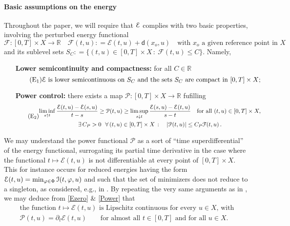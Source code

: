 \documentclass[a4paper,10pt,reqno]{amsart} %
\newcommand{\R}{\mathbb{R}}
\numberwithin{equation}{section}
\newcommand{\up}{\uparrow}
\newcommand{\down}{\downarrow}
\newcommand{\Xs}{X}
\newcommand{\md}[2]{\mathsf{d}(#1,#2)}
\newcommand{\ene}[2]{\mathcal{E}(#1,#2)}
\newcommand{\pertn}{\mathcal{F}}
\newcommand{\pert}[2]{\mathcal{F}(#1,#2)}
\newcommand{\pwn}{\mathcal{P}}
\newcommand{\pw}[2]{\mathcal{P}(#1,#2)}
\newcommand{\subl}[1]{S_{#1}}
\begin{document}
 \paragraph{\bf Basic assumptions on the energy}
Throughout the paper, we will require that  ${\mathcal E}$ complies with two basic properties, involving the perturbed energy functional
\begin{equation}
\pertn: [0,T]\times \Xs \to \R \quad \pert tu: = \ene tu + \md{x_o}u \quad \text{with $x_o$ a given reference point in $X$}
\end{equation}
and its sublevel sets $\subl C: = \{ (t,u)\in [0,T]\times \Xs\, : \ \pert tu \leq C\}$. Namely,
\begin{itemize}
\item[\textbf{Lower semicontinuity and compactness:}] for all $C\in \R$
\begin{equation}
\label{Ezero}
\tag{$\mathrm{E}_1$}
\text{$\calE$ is lower semicontinuous on $\subl C  $ and the sets $\subl C$ are compact in $[0,T]\times X$};
\end{equation}
\item[\textbf{Power control:}]  there exists a map $\pwn : [0,T]\times \Xs \to \R$ fufilling 
\begin{equation}
\label{Power}
\tag{$\mathrm{E}_2$}
\begin{gathered}
\liminf_{s\up t} \frac{\ene tu -\ene su}{t-s} \geq \pw tu \geq \limsup_{s\down t} \frac{\ene su -\ene tu}{s-t} \quad \text{for all } (t,u) \in [0,T]\times \Xs,
\\
\exists\, C_P>0 \ \  \forall\, (t,u) \in [0,T]\times \Xs\, : \quad
|\pw tu | \leq C_P \pert tu\,.
\end{gathered}
\end{equation}
\end{itemize}
We may understand the power functional $\pwn$ as a sort of ``time superdifferential'' of the energy functional, surrogating its partial time derivative 
in the case where the functional  $t\mapsto \ene tu $ is not differentiable  at every point of $[0,T]\times \Xs$. This for instance occurs for reduced energies having the form $\ene tu = \min_{\varphi \in \Phi} \calI(t,\varphi, u)$ and such that the set of minimizers 
does not reduce to a singleton,
as considered, e.g., in \cite{KMZ10-poly,MRS2013,MRS-MJM,SavMin16}.
 By repeating the very same arguments as in \cite{SavMin16}, we may deduce from \eqref{Ezero} \& \eqref{Power} that
\begin{equation}
\label{Lip-cont-E}
\begin{gathered}
\text{
the function $t\mapsto \ene tu $ is Lipschitz continuous  for every $u\in \Xs$, with}
\\
\pw tu = \partial_t \ene tu \qquad \text{for almost all } t \in [0,T] \text{ and for all } u \in \Xs.
\end{gathered}
\end{equation}
\end{document}
